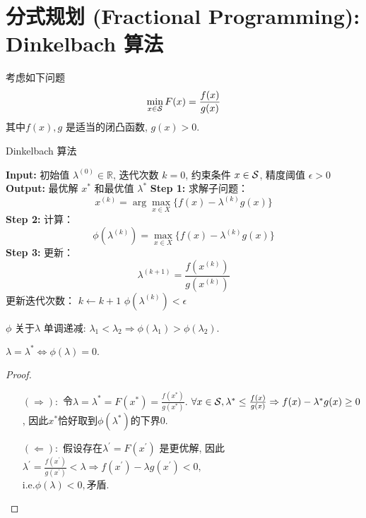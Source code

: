 \section{分式规划 (Fractional Programming): Dinkelbach 算法}
考虑如下问题
\[
\min_{x\in \S} F(x) = \frac{f(x)}{g(x)}
\]	
其中$f(x), g$ 是适当的闭凸函数, $g(x) > 0. $
\begin{shaded}
\begin{algorithm}[H]
\caption{Dinkelbach 算法}
\begin{algorithmic}[1]
\State \textbf{Input:} 初始值 \( \lambda^{(0)} \in \mathbb{R} \), 迭代次数 \( k = 0 \), 约束条件 \( x \in \S \), 精度阈值 \( \epsilon > 0 \)
\State \textbf{Output:} 最优解 \( x^* \) 和最优值 \( \lambda^* \)
\Repeat
\State \textbf{Step 1:} 求解子问题：
\[
x^{(k)} = \arg \max_{x \in X} \bigl\{ f(x) - \lambda^{(k)} g(x) \bigr\}
\]
\State \textbf{Step 2:} 计算：
\[
\phi(\lambda^{(k)}) = \max_{x \in X} \bigl\{ f(x) - \lambda^{(k)} g(x) \bigr\}
\]
\State \textbf{Step 3:} 更新：
\[
\lambda^{(k+1)} = \frac{f(x^{(k)})}{g(x^{(k)})}
\]
\State 更新迭代次数： \( k \gets k + 1 \)
\Until \( \phi(\lambda^{(k)}) < \epsilon \)
\end{algorithmic}	
\end{algorithm}
\end{shaded}
\begin{property}
$\phi$ 关于$\lambda$ 单调递减: \(\lambda_1<\lambda_2\Rightarrow \phi(\lambda_1)>\phi(\lambda_2).\)
\end{property}
\begin{property}
$\lambda = \lambda^*\Leftrightarrow \phi(\lambda)=0.$ 
\begin{proof}
\begin{itemize} 
\item[$(\Rightarrow): $] 令$\lambda=\lambda^*=F(x^*)=\frac{f(x^*)}{g(x^*)}.$
$ \forall x \in \S, \lambda^*\leq \frac{f(x)}{g(x)}\Rightarrow f(x)-\lambda^*g(x)\geq 0$, 因此$x^*$恰好取到$\phi(\lambda^*)$的下界$0.$
\item[$(\Leftarrow):$] 假设存在$\lambda^\prime=F(x^\prime)$ 是更优解, 因此$\lambda^\prime=\frac{f(x^\prime)}{g(x^\prime)}<\lambda\Rightarrow f(x^\prime)-\lambda g(x^\prime)<0,$ \\$ \mathrm{i.e.} \phi(\lambda)<0, $矛盾.
\end{itemize}
\end{proof}
\end{property}
